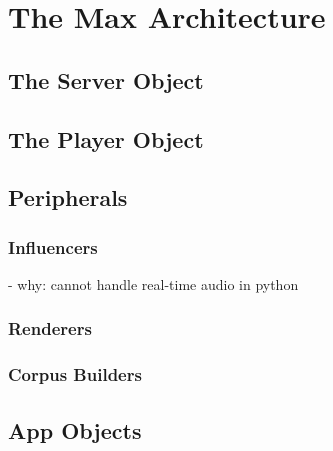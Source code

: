 \chapter{The Max Architecture}\label{sec:3-max-architecture}

\section{The Server Object}\label{ssec:3-server}

\section{The Player Object}\label{ssec:3-player}

\section{Peripherals}\label{ssec:3-peripherals}

\subsection{Influencers}\label{ssec:3-influencers}
- why: cannot handle real-time audio in python

\subsection{Renderers}\label{ssec:3-renderers}

\subsection{Corpus Builders}\label{ssec:3-corpusbuilders}

\section{App Objects}\label{ssec:3-app-objects}

